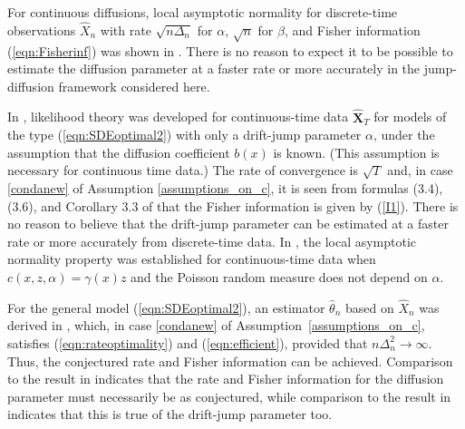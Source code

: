 \documentclass[11pt,a4paper]{article}
\newcommand{\X}{{\mathbf X}}
\numberwithin{equation}{section}
\numberwithin{theorem}{section}
\begin{document}
For continuous diffusions, local asymptotic normality for discrete-time observations $\widehat{X}_n$ with rate $\sqrt{n\Delta_n}$ for $\alpha$, $\sqrt{n}$ for $\beta$, and Fisher information (\ref{eqn:Fisherinf}) was shown in \cite[Theorem 4.1]{gobet2002}. There is no reason to expect it to be possible to estimate the diffusion parameter at a faster rate or more accurately in the jump-diffusion framework considered here. \medskip
 
In \cite{soerensen1991}, likelihood theory was developed for continuous-time data $\widehat{\X}_T$ for models of the type (\ref{eqn:SDEoptimal2}) with only a drift-jump parameter $\alpha$, under the assumption that the diffusion coefficient $b(x)$ is known. (This assumption is necessary for continuous time data.) The rate of convergence is $\sqrt{T}$ and, in case \ref{condanew} of Assumption \ref{assumptions_on_c}, it is seen from formulas (3.4), (3.6), and Corollary 3.3 of \cite{soerensen1991} that the Fisher information is given by (\ref{I1}). There is no reason to believe that the drift-jump parameter can be estimated at a faster rate or more accurately from discrete-time data. In \cite{gloter2018}, the local asymptotic normality property was established for continuous-time data when $c(x,z,\alpha) = \gamma(x) z$ and the Poisson random measure does not depend on $\alpha$. \medskip

For the general model (\ref{eqn:SDEoptimal2}), an estimator $\hat{\theta}_n$ based on $\widehat{X}_n$ was derived in \cite{shimizu2006}, which, in case \ref{condanew} of Assumption~\ref{assumptions_on_c}, satisfies (\ref{eqn:rateoptimality}) and (\ref{eqn:efficient}), provided that $n\Delta_n^2 \to \infty$. Thus, the conjectured rate and Fisher information can be achieved. Comparison to the result in \cite{gobet2002} indicates that the rate and Fisher information for the diffusion parameter must necessarily be as conjectured, while comparison to the result in \cite{soerensen1991} indicates that this is true of the drift-jump parameter too.\medskip
\end{document}
